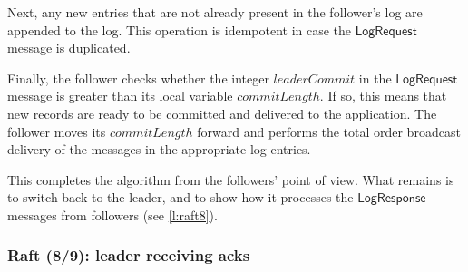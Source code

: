 Next, any new entries that are not already present in the follower's log are appended to the log.
This operation is idempotent in case the $\mathsf{LogRequest}$ message is duplicated.

Finally, the follower checks whether the integer $\mathit{leaderCommit}$ in the $\mathsf{LogRequest}$ message is greater than its local variable $\mathit{commitLength}$.
If so, this means that new records are ready to be committed and delivered to the application.
The follower moves its $\mathit{commitLength}$ forward and performs the total order broadcast delivery of the messages in the appropriate log entries.

This completes the algorithm from the followers' point of view.
What remains is to switch back to the leader, and to show how it processes the $\mathsf{LogResponse}$ messages from followers (see \autoref{l:raft8}).

\begin{frame}
    \label{s:raft8}
    \frametitle{Raft (8/9): leader receiving acks}
    \footnotesize
\end{frame}
\label{l:raft8}

